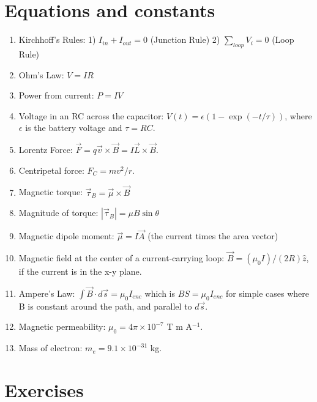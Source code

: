 \documentclass[10pt]{article}
\begin{document}
\maketitle

\section{Equations and constants}

\begin{enumerate}
\item Kirchhoff's Rules: 1) $I_{in} + I_{out} = 0$ (Junction Rule) 2) $\sum_{loop} V_i = 0$ (Loop Rule)
\item Ohm's Law: $V = IR$
\item Power from current: $P=IV$
\item Voltage in an RC across the capacitor: $V(t) = \epsilon\left(1 - \exp\left(-t/\tau\right)\right)$, where $\epsilon$ is the battery voltage and $\tau = RC$.
\item Lorentz Force: $\vec{F} = q \vec{v} \times \vec{B} = I \vec{L} \times \vec{B}$.
\item Centripetal force: $F_C = mv^2/r$.
\item Magnetic torque: $\vec{\tau}_B = \vec{\mu} \times \vec{B}$
\item Magnitude of torque: $|\vec{\tau}_B| = \mu B \sin\theta$
\item Magnetic dipole moment: $\vec{\mu} = I \vec{A}$ (the current times the area vector)
\item Magnetic field at the center of a current-carrying loop: $\vec{B} = (\mu_0 I)/(2 R)\hat{z}$, if the current is in the x-y plane.
\item Ampere's Law: $\int \vec{B} \cdot d\vec{s} = \mu_0 I_{enc}$ which is $B S = \mu_0 I_{enc}$ for simple cases where B is constant around the path, and parallel to $d\vec{s}$.
\item Magnetic permeability: $\mu_0 = 4\pi \times 10^{-7}$ T m A$^{-1}$.
\item Mass of electron: $m_e = 9.1 \times 10^{-31}$ kg.
\end{enumerate}

\clearpage

\section{Exercises}
\end{document}
